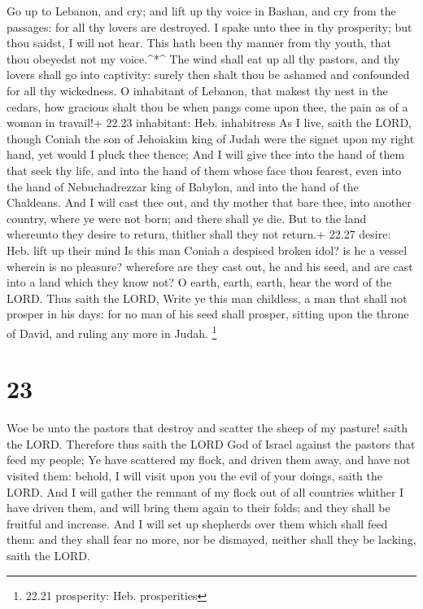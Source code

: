  Go up to Lebanon, and cry; and lift up thy voice in
Bashan, and cry from the passages: for all thy lovers are destroyed.
 I spake unto thee in thy prosperity; but thou saidst, I
will not hear. This hath been thy manner from thy youth, that thou
obeyedst not my voice.\^{}*\^{}  The wind shall eat up all
thy pastors, and thy lovers shall go into captivity: surely then shalt
thou be ashamed and confounded for all thy wickedness.  O
inhabitant of Lebanon, that makest thy nest in the cedars, how gracious
shalt thou be when pangs come upon thee, the pain as of a woman in
travail!+ 22.23 inhabitant: Heb. inhabitress  As I live,
saith the LORD, though Coniah the son of Jehoiakim king of Judah were
the signet upon my right hand, yet would I pluck thee thence;
 And I will give thee into the hand of them that seek thy
life, and into the hand of them whose face thou fearest, even into the
hand of Nebuchadrezzar king of Babylon, and into the hand of the
Chaldeans.  And I will cast thee out, and thy mother that
bare thee, into another country, where ye were not born; and there shall
ye die.  But to the land whereunto they desire to return,
thither shall they not return.+ 22.27 desire: Heb. lift up their mind
 Is this man Coniah a despised broken idol? is he a vessel
wherein is no pleasure? wherefore are they cast out, he and his seed,
and are cast into a land which they know not?  O earth,
earth, earth, hear the word of the LORD.  Thus saith the
LORD, Write ye this man childless, a man that shall not prosper in his
days: for no man of his seed shall prosper, sitting upon the throne of
David, and ruling any more in Judah. \footnote{22.21 prosperity: Heb.
  prosperities}

\hypertarget{section-22}{%
\section{23}\label{section-22}}

 Woe be unto the pastors that destroy and scatter the sheep
of my pasture! saith the LORD.  Therefore thus saith the
LORD God of Israel against the pastors that feed my people; Ye have
scattered my flock, and driven them away, and have not visited them:
behold, I will visit upon you the evil of your doings, saith the LORD.
 And I will gather the remnant of my flock out of all
countries whither I have driven them, and will bring them again to their
folds; and they shall be fruitful and increase.  And I will
set up shepherds over them which shall feed them: and they shall fear no
more, nor be dismayed, neither shall they be lacking, saith the LORD.

